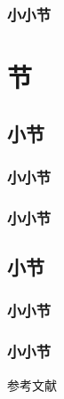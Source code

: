 \documentclass[
11pt,notheorems,hyperref={pdfauthor=whatever},aspectratio=169
]{beamer}
\begin{document}
\subsubsection{小小节}
\section{节}
\subsection{小节}
\subsubsection{小小节}
\subsubsection{小小节}
\subsection{小节}
\subsubsection{小小节}
\subsubsection{小小节}

\begin{frame}[allowframebreaks]{参考文献}
    \printbibliography
\end{frame}
\end{document}
